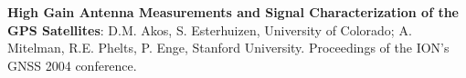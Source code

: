 \begin{resume}

{\bf High Gain Antenna Measurements and Signal Characterization of the GPS Satellites}: D.M. Akos, S. Esterhuizen, University of Colorado; A. Mitelman, R.E. Phelts, P. Enge, Stanford University. Proceedings of the ION's GNSS 2004 conference.
\end{resume}


% 
